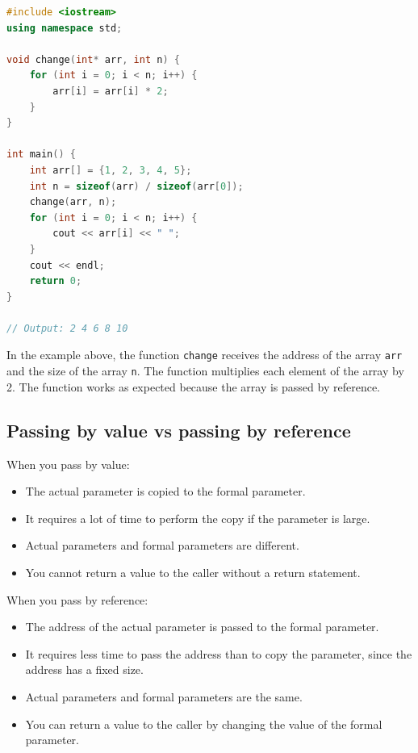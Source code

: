 \begin{lstlisting}[language=C++]
#include <iostream>
using namespace std;

void change(int* arr, int n) {
    for (int i = 0; i < n; i++) {
        arr[i] = arr[i] * 2;
    }
}

int main() {
    int arr[] = {1, 2, 3, 4, 5};
    int n = sizeof(arr) / sizeof(arr[0]);
    change(arr, n);
    for (int i = 0; i < n; i++) {
        cout << arr[i] << " ";
    }
    cout << endl;
    return 0;
}

// Output: 2 4 6 8 10
\end{lstlisting}

In the example above, the function \texttt{change} receives the address of the
array \texttt{arr} and the size of the array \texttt{n}. The function multiplies
each element of the array by 2. The function works as expected because the array
is passed by reference.

\subsection{Passing by value vs passing by reference}

When you pass by value:

\begin{itemize}
    \item The actual parameter is copied to the formal parameter.
    \item It requires a lot of time to perform the copy if the parameter is large.
    \item Actual parameters and formal parameters are different.
    \item You cannot return a value to the caller without a return statement.
\end{itemize}

When you pass by reference:

\begin{itemize}
    \item The address of the actual parameter is passed to the formal parameter.
    \item It requires less time to pass the address than to copy the parameter,
    since the address has a fixed size.
    \item Actual parameters and formal parameters are the same.
    \item You can return a value to the caller by changing the value of the
    formal parameter.
\end{itemize}

